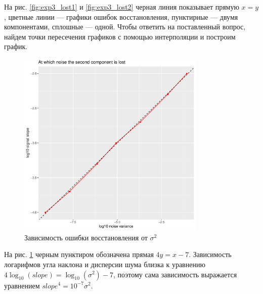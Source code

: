 \documentclass[specialist, substylefile = spbureport.rtx,
    subf,href,colorlinks=true, 12pt]{disser}
\begin{document}
        На рис. \ref{fig:exp3_lost1} и \ref{fig:exp3_lost2} черная линия показывает прямую $x = y$, цветные линии --- графики ошибок восстановления, пунктирные --- двумя компонентами, сплошные --- одной. Чтобы ответить на поставленный вопрос, найдем точки пересечения графиков с помощью интерполяции и построим график.

        \begin{figure}[h]
            \centering
            \includegraphics[width=0.8\textwidth]{experiment_3_lost3.pdf}
            \caption{Зависимость ошибки восстановления от $\sigma^2$}
            \label{fig:exp3_lost3}
        \end{figure}

        На рис. \ref{fig:exp3_lost3} черным пунктиром обозначена прямая $4y = x - 7$. Зависимость логарифмов угла наклона и дисперсии шума близка к уравнению $4\log_{10}(slope) = \log_{10}(\sigma^2) - 7$, поэтому сама зависимость выражается уравнением $slope^4 = 10^{-7}\sigma^2$.




        

        
\end{document}
